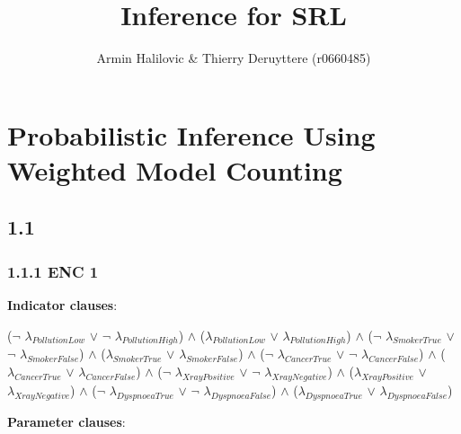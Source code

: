 \documentclass[a4paper,10pt]{report}
\title{Inference for SRL}
\author{Armin Halilovic \& Thierry Deruyttere (r0660485)}
\begin{document}
\maketitle
\chapter{Probabilistic Inference Using Weighted Model Counting}
\section*{1.1}
\subsection*{1.1.1 ENC 1}

\textbf{Indicator clauses}: 
\begin{center}
($\neg$ $\lambda_{PollutionLow}$ $\lor$ $\neg$ $\lambda_{PollutionHigh}$) $\land$ 
($\lambda_{PollutionLow}$ $\lor$ $\lambda_{PollutionHigh}$) $\land$ 
($\neg$ $\lambda_{SmokerTrue}$ $\lor$ $\neg$ $\lambda_{SmokerFalse}$) $\land$ 
($\lambda_{SmokerTrue}$ $\lor$ $\lambda_{SmokerFalse}$) $\land$ 
($\neg$ $\lambda_{CancerTrue}$ $\lor$ $\neg$ $\lambda_{CancerFalse}$) $\land$ 
($\lambda_{CancerTrue}$ $\lor$ $\lambda_{CancerFalse}$) $\land$ 
($\neg$ $\lambda_{XrayPositive}$ $\lor$ $\neg$ $\lambda_{XrayNegative}$) $\land$ 
($\lambda_{XrayPositive}$ $\lor$ $\lambda_{XrayNegative}$) $\land$ 
($\neg$ $\lambda_{DyspnoeaTrue}$ $\lor$ $\neg$ $\lambda_{DyspnoeaFalse}$) $\land$ 
($\lambda_{DyspnoeaTrue}$ $\lor$ $\lambda_{DyspnoeaFalse}$)
\end{center}
\textbf{Parameter clauses}: 
\end{document}
